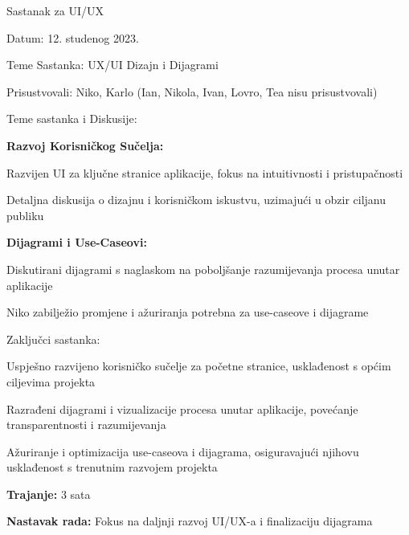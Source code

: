 \begin{packed_enum}
\item Sastanak za UI/UX
    \item[] \begin{packed_item}
        \item Datum: 12. studenog 2023.
        \item Teme Sastanka: UX/UI Dizajn i Dijagrami
        \item Prisustvovali: Niko, Karlo (Ian, Nikola, Ivan, Lovro, Tea nisu prisustvovali)
        \item Teme sastanka i Diskusije:
            \begin{packed_item}
                \item \textbf{Razvoj Korisničkog Sučelja:}
                    \begin{packed_item}
                        \item Razvijen UI za ključne stranice aplikacije, fokus na intuitivnosti i pristupačnosti
                        \item Detaljna diskusija o dizajnu i korisničkom iskustvu, uzimajući u obzir ciljanu publiku
                    \end{packed_item}
                \item \textbf{Dijagrami i Use-Caseovi:}
                    \begin{packed_item}
                        \item Diskutirani dijagrami s naglaskom na poboljšanje razumijevanja procesa unutar aplikacije
                        \item Niko zabilježio promjene i ažuriranja potrebna za use-caseove i dijagrame
                    \end{packed_item}
            \end{packed_item}
        \item Zaključci sastanka:
            \begin{packed_item}
                \item Uspješno razvijeno korisničko sučelje za početne stranice, usklađenost s općim ciljevima projekta
                \item Razrađeni dijagrami i vizualizacije procesa unutar aplikacije, povećanje transparentnosti i razumijevanja
                \item Ažuriranje i optimizacija use-caseova i dijagrama, osiguravajući njihovu usklađenost s trenutnim razvojem projekta
            \end{packed_item}
        \item \textbf{Trajanje:} 3 sata
        \item \textbf{Nastavak rada:} Fokus na daljnji razvoj UI/UX-a i finalizaciju dijagrama
    \end{packed_item}


\end{packed_enum}
